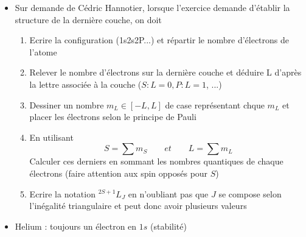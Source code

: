 \begin{itemize}
\begin{itemize}
\begin{itemize}
	      	      	\item Sur demande de Cédric Hannotier, lorsque l'exercice demande d'établir la structure de la dernière couche, on doit 
	      	      	      \begin{enumerate}
	      	      	      	\item Ecrire la configuration (1s2s2P...) et répartir le nombre d'électrons de l'atome
	      	      	      	\item Relever le nombre d'électrons sur la dernière couche et déduire L d'après la lettre associée à la couche ($S : L=0, P : L=1$, ...)
	      	      	      	      				
	      	      	      	\item Dessiner un nombre $m_L \in [-L,L]$ de case représentant chque $m_L$ et placer les électrons selon le principe de Pauli
	      	      	      	\item En utilisant 
	      	      	      	      \begin{equation}
	      	      	      	      	S = \sum m_S \qquad et \qquad L = \sum m_L
	      	      	      	      \end{equation}
	      	      	      	      Calculer ces derniers en sommant les nombres quantiques de chaque électrons (faire attention aux spin opposés pour $S$)
	      	      	      	      				
	      	      	      	\item Ecrire la notation $^{2S+1}L_J$ en n'oubliant pas que $J$ se compose selon l'inégalité triangulaire et peut donc avoir plusieurs valeurs
	      	      	      \end{enumerate}
	      	      	\item Helium : toujours un électron en $1s$ (stabilité)
	      	      \end{itemize}
	      \end{itemize}
\end{itemize}